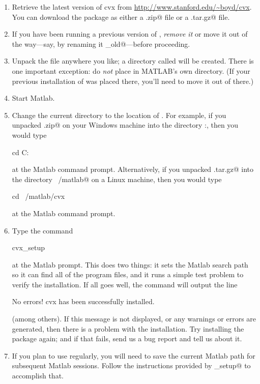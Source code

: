 \documentclass[12pt]{article}
\begin{document}
\begin{enumerate}
\item Retrieve the latest version of cvx from \url{http://www.stanford.edu/~boyd/cvx}.
You can download the package as either a \verb@.zip@ file or a \verb@.tar.gz@ 
file.
\item If you have been running a previous version of \cvx, \emph{remove it} or
move it out of the way---say, by renaming it \verb@cvx_old@---before proceeding.
\item Unpack the file anywhere you like; a directory called \verb@cvx@ will be created.
There is one important exception: do \emph{not} place \cvx in MATLAB's own
\verb@toolbox@ directory. (If your previous installation of \cvx was placed
there, you'll need to move it out of there.)
\item Start Matlab.
\item Change the current directory to the location of \cvx.
For example, if you unpacked \verb@cvx.zip@ on your Windows machine into the
directory \verb@C:\Matlab\personal@, then you would type
\begin{code}
		cd C:\Matlab\personal\cvx
\end{code}
at the Matlab command prompt. Alternatively, if you unpacked \verb@cvx.tar.gz@
into the directory \verb@~/matlab@ on a Linux machine, then you would type
\begin{code}
		cd ~/matlab/cvx
\end{code}
at the Matlab command prompt.
\item Type the command
\begin{code}
		cvx_setup
\end{code}
at the Matlab prompt. This does two things: 
it sets the Matlab search path so it can find all of the \cvx program files,
and it runs a simple test problem to verify the installation.
If all goes well, the command will output the line
\begin{code}
	No errors! cvx has been successfully installed.
\end{code}
(among others). If this message is not displayed, or any warnings or errors are generated,
then there is a problem with the \cvx installation. Try installing the package
again; and if that fails, send us a bug report and tell us about it.
\item If you plan to use \cvx regularly, you will need to save the current
Matlab path for subsequent Matlab sessions. Follow the instructions provided
by \verb@cvx_setup@ to accomplish that.
\end{enumerate}
\end{document}
